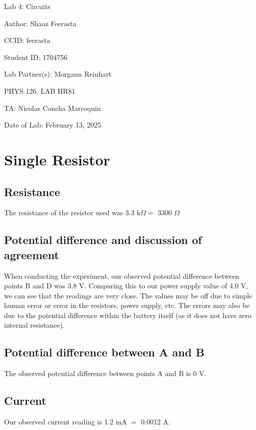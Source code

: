 \documentclass[12pt]{article}
\begin{document}
\pagebreak

\begin{titlepage}
    \begin{center}
        \vspace*{\fill}
        Lab 4: Circuits

        Author: Shaaz Feerasta

        CCID: feerasta

        Student ID: 1704756

        Lab Partner(s): Morgann Reinhart

        PHYS 126, LAB HR81

        TA: Nicolas Concha Marroquin

        Date of Lab: February 13, 2025
        \vspace*{\fill}
    \end{center}
\end{titlepage}

\section{Single Resistor}
\subsection{Resistance}
The resistance of the resistor used was 3.3 k$\Omega =$ 3300 $\Omega$

\subsection{Potential difference and discussion of agreement}
When conducting the experiment, our observed potential difference between points B and D was 3.8 V.
Comparing this to our power supply value of 4.0 V, we can see that the readings are very close.
The values may be off due to simple human error or error in the resistors, power supply, etc. 
The errors may also be due to the potential difference within the battery itself (as it does not have zero internal resistance).

\subsection{Potential difference between A and B}
The observed potential difference between points A and B is 0 V.

\subsection{Current}
Our observed current reading is 1.2 mA $=$ 0.0012 A.
\end{document}
